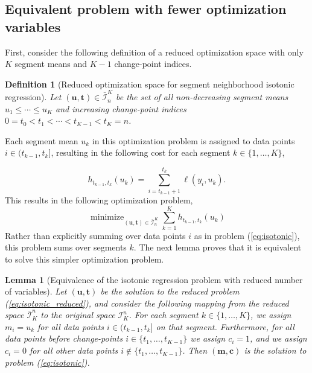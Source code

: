 \documentclass{article}
\newtheorem{lemma}{Lemma}
\newtheorem{definition}{Definition}
\DeclareMathOperator*{\minimize}{minimize}
\begin{document}
\subsection{Equivalent problem with fewer optimization 
variables}

First, consider the following definition of a reduced optimization
space with only $K$ segment means and $K-1$ change-point indices.

\begin{definition}[Reduced optimization space for segment neighborhood isotonic regression]
\label{def:Ibar}
  Let $(\mathbf u, \mathbf t)\in\bar{\mathcal I}_n^K$ be the set of
  all non-decreasing segment means $u_1\leq\cdots\leq u_K$ and
  increasing change-point indices $0=t_0<t_1<\cdots<t_{K-1}<t_K=n$.
\end{definition}

Each segment mean $u_k$ in this optimization problem is assigned to
data points $i\in(t_{k-1},t_k]$, resulting in the following cost
for each segment $k\in\{1, \dots, K\}$,

\begin{equation}
  \label{eq:h}
  h_{t_{k-1}, t_k}(u_k) = \sum_{i=t_{k-1}+1}^{t_k} \ell(y_i, u_k).
\end{equation}
This results in the following optimization problem,
\begin{equation}
  \label{eq:isotonic_reduced}
  \minimize_{(\mathbf u, \mathbf t)\in\bar{\mathcal I}_n^K}
  \sum_{k=1}^K
  h_{t_{k-1}, t_k}(u_k)
\end{equation}
Rather than explicitly summing over data points $i$ as in problem
(\ref{eq:isotonic}), this problem sums over segments $k$. The next lemma
proves that it is equivalent to solve this simpler optimization problem.

\begin{lemma}[Equivalence of the isotonic regression problem with reduced number of variables]
  \label{lemma:reduced}
  Let $(\mathbf u, \mathbf t)$ be the solution to the reduced problem
  (\ref{eq:isotonic_reduced}), and consider the following mapping from
  the reduced space $\bar{\mathcal I}_K^n$ to the original space
  $\mathcal I_K^n$. For each segment $k\in\{1,\dots,K\}$, we assign
  $m_i = u_k$ for all data points $i\in(t_{k-1},t_k]$ on that
  segment. Furthermore, for all data points before change-points
  $i\in\{t_1,\dots,t_{K-1}\}$ we assign $c_i=1$, and we assign $c_i=0$
  for all other data points $i\not\in\{t_1,\dots,t_{K-1}\}$. Then
  $(\mathbf m, \mathbf c)$ is the solution to problem
  (\ref{eq:isotonic}).
\end{lemma}
\end{document}
